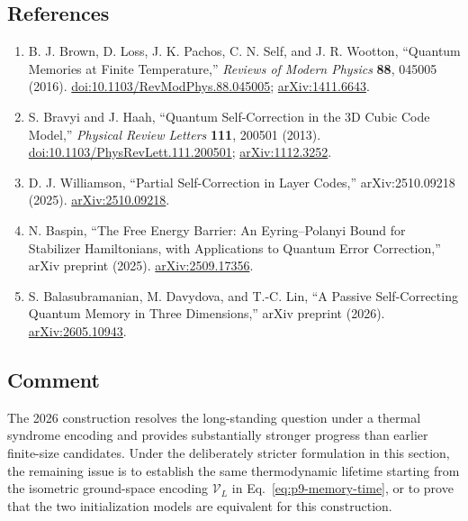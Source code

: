 \subsection*{References}

\begin{enumerate}[label={},leftmargin=4.8em,labelsep=0.5em]
  \footnotesize
  \item[\textup{[BLP+16]}]\label{ref:p9-brown-review}
  B. J. Brown, D. Loss, J. K. Pachos, C. N. Self, and J. R. Wootton,
  ``Quantum Memories at Finite Temperature,''
  \emph{Reviews of Modern Physics} \textbf{88}, 045005 (2016).
  \href{https://doi.org/10.1103/RevModPhys.88.045005}%
       {doi:10.1103/RevModPhys.88.045005};
  \href{https://arxiv.org/abs/1411.6643}{arXiv:1411.6643}.

  \item[\textup{[BH13]}]\label{ref:p9-bravyi-haah}
  S. Bravyi and J. Haah,
  ``Quantum Self-Correction in the 3D Cubic Code Model,''
  \emph{Physical Review Letters} \textbf{111}, 200501 (2013).
  \href{https://doi.org/10.1103/PhysRevLett.111.200501}%
       {doi:10.1103/PhysRevLett.111.200501};
  \href{https://arxiv.org/abs/1112.3252}{arXiv:1112.3252}.

  \item[\textup{[Wil25]}]\label{ref:p9-williamson}
  D. J. Williamson,
  ``Partial Self-Correction in Layer Codes,'' arXiv:2510.09218 (2025).
  \href{https://arxiv.org/abs/2510.09218}{arXiv:2510.09218}.

  \item[\textup{[Bas25]}]\label{ref:p9-baspin}
  N. Baspin, ``The Free Energy Barrier: An Eyring--Polanyi Bound for
  Stabilizer Hamiltonians, with Applications to Quantum Error Correction,''
  arXiv preprint (2025).
  \href{https://arxiv.org/abs/2509.17356}{arXiv:2509.17356}.

  \item[\textup{[BDL26]}]\label{ref:p9-balasubramanian-davydova-lin}
  S. Balasubramanian, M. Davydova, and T.-C. Lin,
  ``A Passive Self-Correcting Quantum Memory in Three Dimensions,'' arXiv
  preprint (2026).
  \href{https://arxiv.org/abs/2605.10943}{arXiv:2605.10943}.
\end{enumerate}

\subsection*{Comment}

The 2026 construction resolves the long-standing question under a thermal
syndrome encoding and provides substantially stronger progress than earlier
finite-size candidates.  Under the deliberately stricter formulation in this
section, the remaining issue is to establish the same thermodynamic lifetime
starting from the isometric ground-space encoding $\mathcal V_L$ in
Eq.~\eqref{eq:p9-memory-time}, or to prove that the two initialization models
are equivalent for this construction.


